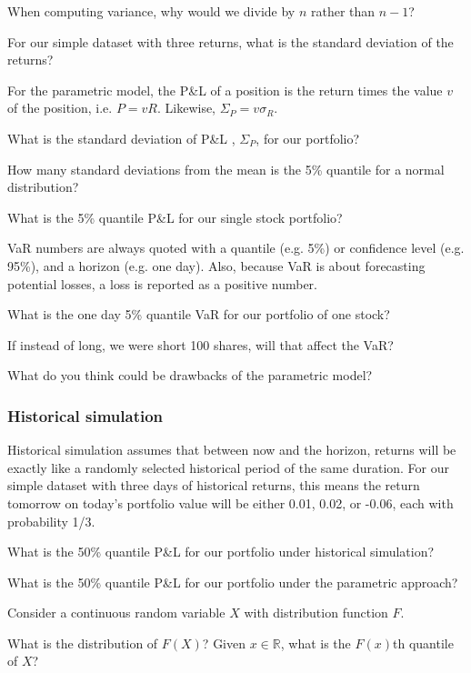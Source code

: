 \documentclass{report}
\numberwithin{problem}{chapter} %
\let\oldroblem\problem
\renewcommand{\problem}{ \oldroblem  \normalfont}
\newcommand{\vs}{\vspace}
\newcommand{\pnl}{P\&L }
\begin{document}
\problem When computing variance, why would we divide by $n$ rather than $n-1$?

\problem For our simple dataset with three returns, what is the standard deviation of the returns?

\vs{.5cm}

For the parametric model, the \pnl of a \gls{position} is the return times the value $v$ of the position, i.e. $P = v R$. Likewise, $\Sigma_P = v \sigma_R$.

\problem What is the standard deviation of \pnl, $\Sigma_P$, for our portfolio?

\problem How many standard deviations from the mean is the 5\% quantile for a normal distribution?

\problem What is the 5\% quantile \pnl for our single stock portfolio?

\vs{.5cm}
\gls{VaR} numbers are always quoted with a quantile (e.g. 5\%)  or confidence level (e.g. 95\%), and a horizon (e.g. one day). Also, because VaR is about forecasting potential losses, a loss is reported as a positive number. 

\problem What is the one day 5\% quantile VaR for our portfolio of one stock?

\problem If instead of long, we were short 100 shares, will that affect the VaR?

\problem What do you think could be drawbacks of the parametric model?

\pagebreak 
\subsubsection{Historical simulation}
Historical simulation assumes that between now and the horizon, returns will be exactly like a randomly selected historical period of the same duration. For our simple dataset with three days of historical returns, this means the return tomorrow on today's portfolio value will be either 0.01, 0.02, or -0.06, each with probability 1/3.

\problem What is the 50\% quantile \pnl for our portfolio under historical simulation? 

\problem What is the 50\% quantile \pnl for our portfolio under the parametric approach?

\vs{3mm}
Consider a continuous random variable $X$ with distribution function $F$. 

\problem What is the distribution of $F(X)$?  Given $x \in \mathbb{R}$, what is the $F(x)$th quantile of $X$? 
\vs{5mm}
\end{document}
